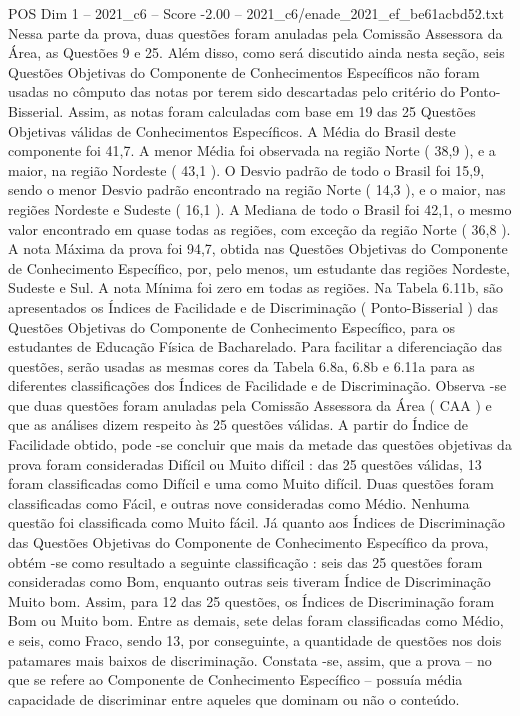 \begin{textsample}{POS Dim 1 – 2021\_c6 – Score -2.00 – 2021\_c6/enade\_2021\_ef\_be61acbd52.txt}
Nessa parte da prova, duas questões foram anuladas pela Comissão Assessora da Área, as Questões 9 e 25.
Além disso, como será discutido ainda nesta seção, seis Questões Objetivas do Componente de Conhecimentos Específicos não foram usadas no cômputo das notas por terem sido descartadas pelo critério do Ponto-Bisserial.
Assim, as notas foram calculadas com base em 19 das 25 Questões Objetivas válidas de Conhecimentos Específicos.
A Média do Brasil deste componente foi 41,7.
A menor Média foi observada na região Norte ( 38,9 ), e a maior, na região Nordeste ( 43,1 ).
O Desvio padrão de todo o Brasil foi 15,9, sendo o menor Desvio padrão encontrado na região Norte ( 14,3 ), e o maior, nas regiões Nordeste e Sudeste ( 16,1 ).
A Mediana de todo o Brasil foi 42,1, o mesmo valor encontrado em quase todas as regiões, com exceção da região Norte ( 36,8 ).
A nota Máxima da prova foi 94,7, obtida nas Questões Objetivas do Componente de Conhecimento Específico, por, pelo menos, um estudante das regiões Nordeste, Sudeste e Sul.
A nota Mínima foi zero em todas as regiões.
Na Tabela 6.11b, são apresentados os Índices de Facilidade e de Discriminação ( Ponto-Bisserial ) das Questões Objetivas do Componente de Conhecimento Específico, para os estudantes de Educação Física de Bacharelado.
Para facilitar a diferenciação das questões, serão usadas as mesmas cores da Tabela 6.8a, 6.8b e 6.11a para as diferentes classificações dos Índices de Facilidade e de Discriminação.
Observa -se que duas questões foram anuladas pela Comissão Assessora da Área ( CAA ) e que as análises dizem respeito às 25 questões válidas.
A partir do Índice de Facilidade obtido, pode -se concluir que mais da metade das questões objetivas da prova foram consideradas Difícil ou Muito difícil : das 25 questões válidas, 13 foram classificadas como Difícil e uma como Muito difícil.
Duas questões foram classificadas como Fácil, e outras nove consideradas como Médio.
Nenhuma questão foi classificada como Muito fácil.
Já quanto aos Índices de Discriminação das Questões Objetivas do Componente de Conhecimento Específico da prova, obtém -se como resultado a seguinte classificação : seis das 25 questões foram consideradas como Bom, enquanto outras seis tiveram Índice de Discriminação Muito bom.
Assim, para 12 das 25 questões, os Índices de Discriminação foram Bom ou Muito bom.
Entre as demais, sete delas foram classificadas como Médio, e seis, como Fraco, sendo 13, por conseguinte, a quantidade de questões nos dois patamares mais baixos de discriminação.
Constata -se, assim, que a prova – no que se refere ao Componente de Conhecimento Específico – possuía média capacidade de discriminar entre aqueles que dominam ou não o conteúdo.

\end{textsample}
